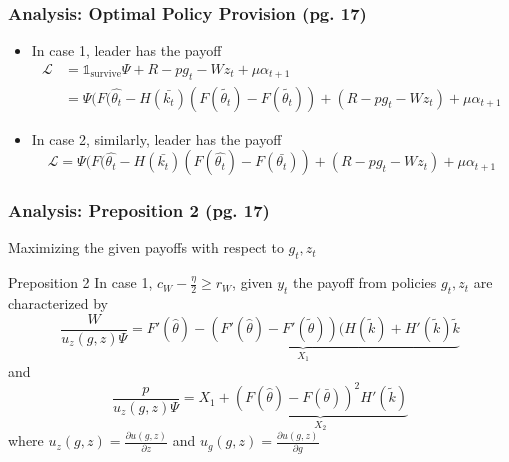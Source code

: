 \documentclass[10pt,handout]{beamer}
\begin{document}
\begin{frame}
\frametitle{Analysis: Optimal Policy Provision (pg. 17)}
\begin{itemize}
    \item In case 1, leader has the payoff
    \begin{align*}
        \mathcal{L} &= \mathbb{1}_{\text{survive}}\Psi + R - pg_t - Wz_t + \mu\alpha_{t+1} \\
        &= \Psi(F(\hat{\theta_t} - H(\bar{k_t})(F(\tilde{\theta_t}) - F(\tilde{\theta_t})) + (R - pg_t - W z_t) + \mu\alpha_{t+1}
    \end{align*}
    \item In case 2, similarly, leader has the payoff
    \[
        \mathcal{L} = \Psi(F(\hat{\theta_t} - H(\bar{k_t})(F(\hat{\theta_t}) - F(\bar{\theta_t})) + (R - pg_t - W z_t) + \mu\alpha_{t+1}
    \]
\end{itemize}
\end{frame}

\begin{frame}
\frametitle{Analysis: Preposition 2 (pg. 17)}
Maximizing the given payoffs with respect to $g_t, z_t$
\vfill
\begin{block}{Preposition 2}
    In case 1, $c_W - \frac{\eta}{2} \geq r_W$, given $y_t$ the payoff from policies $g_t, z_t$ are characterized by
    \[
        \frac{W}{u_z(g, z)\Psi} = \underbrace{F'(\hat{\theta}) - (F'(\hat{\theta}) - F'(\tilde{\theta}))(H(\tilde{k}) + H'(\tilde{k})\tilde{k}}_{X_1}
    \]
    and
    \[
        \frac{p}{u_z(g, z)\Psi} = X_1 + \underbrace{(F(\hat{\theta}) - F(\bar{\theta}))^2H'(\tilde{k})}_{X_2}
    \]
    where $u_z(g,z) = \frac{\partial{u(g,z)}}{\partial{z}}$ and $u_g(g,z) = \frac{\partial{u(g,z)}}{\partial{g}}$ \par
\end{block}
\end{frame}
\end{document}

